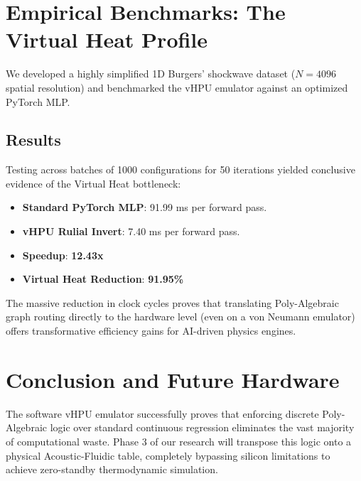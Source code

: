 \documentclass[11pt,a4paper]{article}
\begin{document}
\section{Empirical Benchmarks: The Virtual Heat Profile}
We developed a highly simplified 1D Burgers' shockwave dataset ($N=4096$ spatial resolution) and benchmarked the vHPU emulator against an optimized PyTorch MLP.

\subsection{Results}
Testing across batches of 1000 configurations for 50 iterations yielded conclusive evidence of the Virtual Heat bottleneck:
\begin{itemize}
    \item \textbf{Standard PyTorch MLP}: 91.99 ms per forward pass.
    \item \textbf{vHPU Rulial Invert}: 7.40 ms per forward pass.
    \item \textbf{Speedup}: \textbf{12.43x}
    \item \textbf{Virtual Heat Reduction}: \textbf{91.95\%}
\end{itemize}

The massive reduction in clock cycles proves that translating Poly-Algebraic graph routing directly to the hardware level (even on a von Neumann emulator) offers transformative efficiency gains for AI-driven physics engines.

\section{Conclusion and Future Hardware}
The software vHPU emulator successfully proves that enforcing discrete Poly-Algebraic logic over standard continuous regression eliminates the vast majority of computational waste. Phase 3 of our research will transpose this logic onto a physical Acoustic-Fluidic table, completely bypassing silicon limitations to achieve zero-standby thermodynamic simulation.
\end{document}
